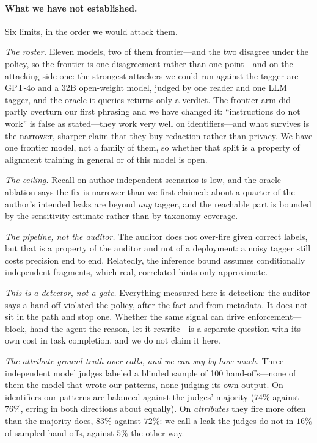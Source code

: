 \documentclass[conference,compsoc]{IEEEtran}
\begin{document}
\paragraph{What we have not established.} Six limits, in the order we would attack them.

\emph{The roster.} Eleven models, two of them frontier---and the two disagree under the policy, so the frontier is one disagreement rather than one point---and on the attacking side one: the strongest attackers we could run against the tagger are GPT-4o and a 32B open-weight model, judged by one reader and one LLM tagger, and the oracle it queries returns only a verdict. The frontier arm did
partly overturn our first phrasing and we have changed it: ``instructions do not
work'' is false as stated---they work very well on identifiers---and what survives
is the narrower, sharper claim that they buy redaction rather than privacy. We have
one frontier model, not a family of them, so whether that split is a property of
alignment training in general or of this model is open.

\emph{The ceiling.} Recall on author-independent scenarios is low, and the oracle
ablation says the fix is narrower than we first claimed: about a quarter of the
author's intended leaks are beyond \emph{any} tagger, and the reachable part is
bounded by the sensitivity estimate rather than by taxonomy coverage.

\emph{The pipeline, not the auditor.} The auditor does not over-fire given correct
labels, but that is a property of the auditor and not of a deployment: a noisy
tagger still costs precision end to end. Relatedly, the inference bound assumes
conditionally independent fragments, which real, correlated hints only approximate.

\emph{This is a detector, not a gate.} Everything measured here is detection: the
auditor says a hand-off violated the policy, after the fact and from metadata. It
does not sit in the path and stop one. Whether the same signal can drive
enforcement---block, hand the agent the reason, let it rewrite---is a separate
question with its own cost in task completion, and we do not claim it here.

\emph{The attribute ground truth over-calls, and we can say by how much.} Three
independent model judges labeled a blinded sample of 100 hand-offs---none of them
the model that wrote our patterns, none judging its own output. On identifiers our
patterns are balanced against the judges' majority ($74\%$ against $76\%$, erring
in both directions about equally). On \emph{attributes} they fire more often than
the majority does, $83\%$ against $72\%$: we call a leak the judges do not in
$16\%$ of sampled hand-offs, against $5\%$ the other way.
\end{document}
